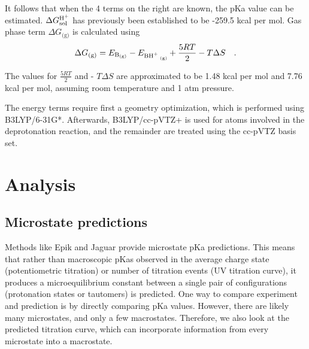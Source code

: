 \documentclass[9pt,lineno,final]{elife}
\begin{document}
It follows that when the 4 terms on the right are known, the pKa value can be estimated.
%
$\Delta G^\textrm{\ce{H+}}_\textrm{sol}$ has previously been established to be -259.5 kcal per mol\cite{Lim1991protonsolvation}.
%
Gas phase term $\Delta G_\textrm{(g)}$ is calculated using
%
\begin{equation}
 \Delta G_\textrm{(g)} = E_\textrm{\ce{B_{(g)}}} - E_\textrm{\ce{BH+ _{(g)}}} + \frac{5RT}{2 } - T \Delta S \quad .
\end{equation}

The values for $\frac{5RT}{2}$ and  - $T \Delta S$ are approximated to be 1.48 kcal per mol and 7.76 kcal per mol, assuming room temperature and 1 atm pressure.~\cite{Bochevarov2016macropKa}

The energy terms require first a geometry optimization, which is performed using B3LYP/6-31G*. 
%
Afterwards, B3LYP/cc-pVTZ+ is used for atoms involved in the deprotonation reaction, and the remainder are treated using the cc-pVTZ basis set.
%


\section{Analysis}

\subsection{Microstate predictions}

Methods like Epik and Jaguar provide microstate pKa predictions.
%
This means that rather than macroscopic pKas observed in the average charge state (potentiometric titration) or number of titration events (UV titration curve), it produces a microequilibrium constant between a single pair of configurations (protonation states or tautomers) is predicted. 
%
One way to compare experiment and prediction is by directly comparing 
pKa values.
%
However, there are likely many microstates, and only a few macrostates.
%
Therefore, we also look at the predicted titration curve, which can incorporate information from every microstate into a macrostate.
\end{document}
